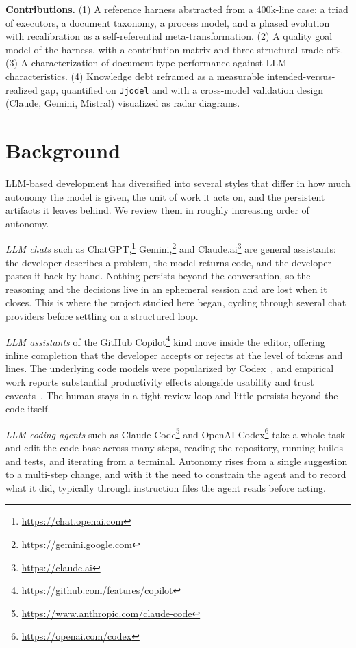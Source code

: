 \documentclass[sigconf]{acmart}
\begin{document}
\noindent\textbf{Contributions.} (1) A reference harness abstracted from a 400k-line case: a triad of executors, a document taxonomy, a process model, and a phased evolution with recalibration as a self-referential meta-transformation. (2) A quality goal model of the harness, with a contribution matrix and three structural trade-offs. (3) A characterization of document-type performance against LLM characteristics. (4) Knowledge debt reframed as a measurable intended-versus-realized gap, quantified on \texttt{Jjodel} and with a cross-model validation design (Claude, Gemini, Mistral) visualized as radar diagrams.

\section{Background}
LLM-based development has diversified into several styles that differ in how much autonomy the model is given, the unit of work it acts on, and the persistent artifacts it leaves behind. We review them in roughly increasing order of autonomy.

\emph{LLM chats} such as ChatGPT,\footnote{\url{https://chat.openai.com}} Gemini,\footnote{\url{https://gemini.google.com}} and Claude.ai\footnote{\url{https://claude.ai}} are general assistants: the developer describes a problem, the model returns code, and the developer pastes it back by hand. Nothing persists beyond the conversation, so the reasoning and the decisions live in an ephemeral session and are lost when it closes. This is where the project studied here began, cycling through several chat providers before settling on a structured loop.

\emph{LLM assistants} of the GitHub Copilot\footnote{\url{https://github.com/features/copilot}} kind move inside the editor, offering inline completion that the developer accepts or rejects at the level of tokens and lines. The underlying code models were popularized by Codex~\cite{chen2021codex}, and empirical work reports substantial productivity effects alongside usability and trust caveats~\cite{peng2023copilot,vaithilingam2022expectation}. The human stays in a tight review loop and little persists beyond the code itself.

\emph{LLM coding agents} such as Claude Code\footnote{\url{https://www.anthropic.com/claude-code}} and OpenAI Codex\footnote{\url{https://openai.com/codex}} take a whole task and edit the code base across many steps, reading the repository, running builds and tests, and iterating from a terminal. Autonomy rises from a single suggestion to a multi-step change, and with it the need to constrain the agent and to record what it did, typically through instruction files the agent reads before acting.
\end{document}
